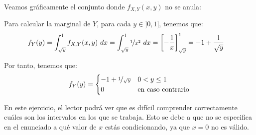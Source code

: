 \begin{ejercicio}
\begin{enumerate}
        Veamos gráficamente el conjunto donde $f_{X,Y}(x,y)$ no se anula:
        \begin{figure}[H]
            \centering
        \end{figure}

        Para calcular la marginal de $Y$, para cada $y\in]0,1]$, tenemos que:
        \begin{align*}
            f_Y(y) &= \int_{\sqrt{y}}^{1} f_{X,Y}(x,y) \ dx
            = \int_{\sqrt{y}}^{1} \nicefrac{1}{x^2} \ dx
            = \left[-\frac{1}{x}\right]_{\sqrt{y}}^{1}
            = -1 + \frac{1}{\sqrt{y}}
        \end{align*}

        Por tanto, tenemos que:
        \begin{equation*}
            f_Y(y) = \begin{cases}
                -1 + \nicefrac{1}{\sqrt{y}} & 0< y\leq 1\\
                0 & \text{en caso contrario}
            \end{cases}
        \end{equation*}

        \begin{observacion}
            En este ejercicio, el lector podrá ver que es difícil comprender correctamente cuáles son los intervalos en los que se trabaja. Esto se debe a que no se especifica en el enunciado a qué valor de $x$ estás condicionando, ya que $x=0$ no es válido.
        \end{observacion}


\end{enumerate}
\end{ejercicio}
